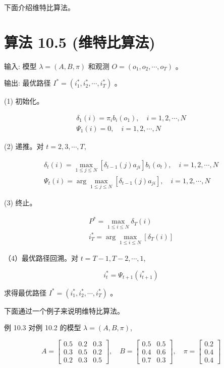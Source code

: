 \documentclass[10pt]{article}
\begin{document}
下面介绍维特比算法。

\section*{算法 10.5 (维特比算法)}
输入: 模型 $\lambda=(A, B, \pi)$ 和观测 $O=\left(o_{1}, o_{2}, \cdots, o_{T}\right)$ 。

输出: 最优路径 $I^{*}=\left(i_{1}^{*}, i_{2}^{*}, \cdots, i_{T}^{*}\right)$ 。

(1) 初始化。

$$
\begin{gathered}
\delta_{1}(i)=\pi_{i} b_{i}\left(o_{1}\right), \quad i=1,2, \cdots, N \\
\Psi_{1}(i)=0, \quad i=1,2, \cdots, N
\end{gathered}
$$

(2) 递推。对 $t=2,3, \cdots, T$,

$$
\begin{gathered}
\delta_{t}(i)=\max _{1 \leqslant j \leqslant N}\left[\delta_{t-1}(j) a_{j i}\right] b_{i}\left(o_{t}\right), \quad i=1,2, \cdots, N \\
\Psi_{t}(i)=\arg \max _{1 \leqslant j \leqslant N}\left[\delta_{t-1}(j) a_{j i}\right], \quad i=1,2, \cdots, N
\end{gathered}
$$

(3) 终止。

$$
\begin{gathered}
P^{*}=\max _{1 \leqslant i \leqslant N} \delta_{T}(i) \\
i_{T}^{*}=\arg \max _{1 \leqslant i \leqslant N}\left[\delta_{T}(i)\right]
\end{gathered}
$$

（4）最优路径回溯。对 $t=T-1, T-2, \cdots, 1$,

$$
i_{t}^{*}=\Psi_{t+1}\left(i_{t+1}^{*}\right)
$$

求得最优路径 $I^{*}=\left(i_{1}^{*}, i_{2}^{*}, \cdots, i_{T}^{*}\right)$ 。

下面通过一个例子来说明维特比算法。

例 10.3 对例 10.2 的模型 $\lambda=(A, B, \pi)$,

$$
A=\left[\begin{array}{lll}
0.5 & 0.2 & 0.3 \\
0.3 & 0.5 & 0.2 \\
0.2 & 0.3 & 0.5
\end{array}\right], \quad B=\left[\begin{array}{ll}
0.5 & 0.5 \\
0.4 & 0.6 \\
0.7 & 0.3
\end{array}\right], \quad \pi=\left[\begin{array}{l}
0.2 \\
0.4 \\
0.4
\end{array}\right]
$$
\end{document}
